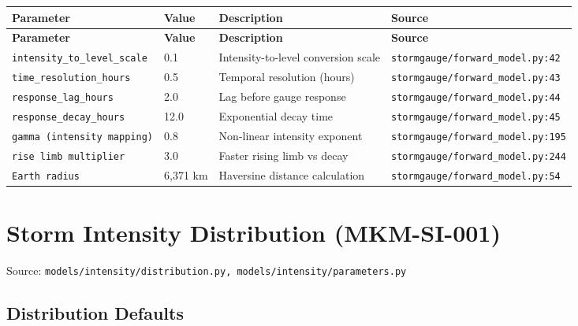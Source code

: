 \documentclass[11pt,a4paper]{article}
\begin{document}
\begin{longtable}{p{4cm}p{4cm}p{5.5cm}p{3.5cm}}
    \toprule
    \textbf{Parameter} & \textbf{Value} & \textbf{Description} & \textbf{Source} \\
    \midrule
    \endfirsthead
    \toprule
    \textbf{Parameter} & \textbf{Value} & \textbf{Description} & \textbf{Source} \\
    \midrule
    \endhead
    \bottomrule
    \endfoot
    \texttt{intensity\_to\_level\_scale} & 0.1 & Intensity-to-level conversion scale & {\scriptsize \texttt{stormgauge/forward\_model.py:42}} \\
    \texttt{time\_resolution\_hours} & 0.5 & Temporal resolution (hours) & {\scriptsize \texttt{stormgauge/forward\_model.py:43}} \\
    \texttt{response\_lag\_hours} & 2.0 & Lag before gauge response & {\scriptsize \texttt{stormgauge/forward\_model.py:44}} \\
    \texttt{response\_decay\_hours} & 12.0 & Exponential decay time & {\scriptsize \texttt{stormgauge/forward\_model.py:45}} \\
    \texttt{gamma (intensity mapping)} & 0.8 & Non-linear intensity exponent & {\scriptsize \texttt{stormgauge/forward\_model.py:195}} \\
    \texttt{rise limb multiplier} & 3.0 & Faster rising limb vs decay & {\scriptsize \texttt{stormgauge/forward\_model.py:244}} \\
    \texttt{Earth radius} & 6,371 km & Haversine distance calculation & {\scriptsize \texttt{stormgauge/forward\_model.py:54}} \\
\end{longtable}

\clearpage

\section{Storm Intensity Distribution (MKM-SI-001)}

Source: \texttt{models/intensity/distribution.py, models/intensity/parameters.py}

\subsection{Distribution Defaults}
\end{document}
